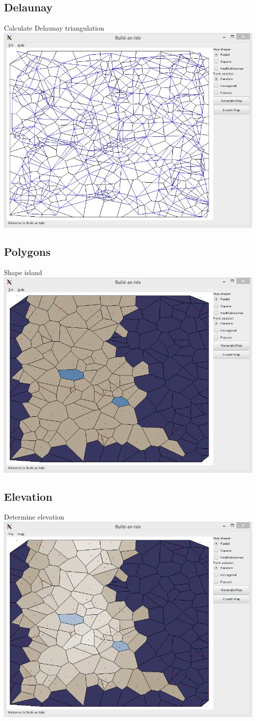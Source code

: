 \documentclass[english,aspectratio=43]{beamer}
\begin{document}
	\subsection{Delaunay}
	\begin{frame}{Calculate Delaunay triangulation}
		\centering
		\includegraphics[width=0.7\linewidth]{delaunay}
	\end{frame}

	\subsection{Polygons}
	\begin{frame}{Shape island}
		\centering
		\includegraphics[width=0.7\linewidth]{polygons}
	\end{frame}

	\subsection{Elevation}
	\begin{frame}{Determine elevation}
		\centering
		\includegraphics[width=0.7\linewidth]{elevation}
	\end{frame}
\end{document}
